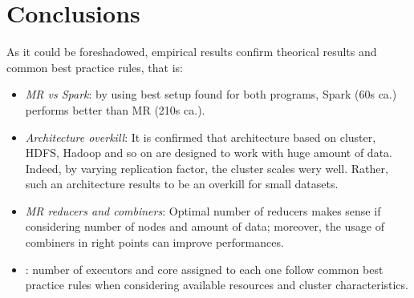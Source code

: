 \chapter{Conclusions}

As it could be foreshadowed, empirical results confirm theorical results and common best practice rules, that is:
\begin{itemize}
  \item \textit{MR vs Spark}: by using best setup found for both programs, Spark (60s ca.) performs better than MR (210s ca.). 
  \item \textit{Architecture overkill}: It is confirmed that architecture based on cluster, HDFS, Hadoop and so on are designed to work with huge amount of data. Indeed, by varying replication factor, the cluster scales wery well. Rather, such an architecture results to be an overkill for small datasets.
  \item \textit{MR reducers and combiners}: Optimal number of reducers makes sense if considering number of nodes and amount of data; moreover, the usage of combiners in right points can improve performances. 
  \item {}: number of executors and core assigned to each one follow common best practice rules when considering available resources and cluster characteristics.
\end{itemize}